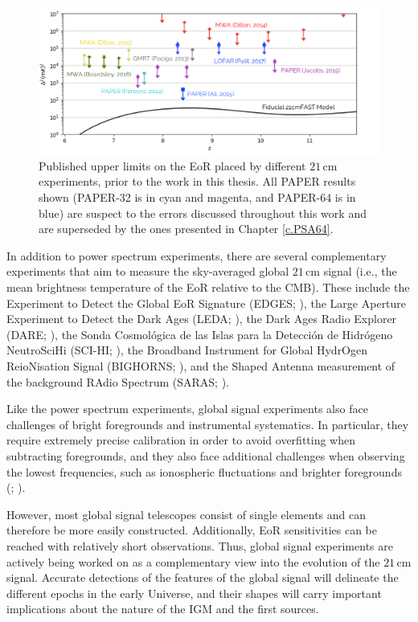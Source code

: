 \begin{figure}
    \centering
    \includegraphics[width=1\textwidth]{plots/statusfield.png}
    \caption{Published upper limits on the EoR placed by different $21$\,cm experiments, prior to the work in this thesis. All PAPER results shown (PAPER-32 is in cyan and magenta, and PAPER-64 is in blue) are suspect to the errors discussed throughout this work and are superseded by the ones presented in Chapter \ref{c.PSA64}.}
    \label{fig:statusfield}
\end{figure}

In addition to power spectrum experiments, there are several complementary experiments that aim to measure the sky-averaged global $21$\,cm signal (i.e., the mean brightness temperature of the EoR relative to the CMB). These include the Experiment to Detect the Global EoR Signature (EDGES; \citealt{bowman2010}), the Large Aperture Experiment to Detect the Dark Ages (LEDA; \citealt{bernardi_et_al2016}), the Dark Ages Radio Explorer (DARE; \citealt{burns2012}), the Sonda Cosmol\'ogica de las Islas para la Detecci\'on de Hidr\'ogeno NeutroSciHi (SCI-HI; \citealt{voytek2014}), the Broadband Instrument for Global HydrOgen ReioNisation Signal (BIGHORNS; \citealt{sokolowski2015}), and the Shaped Antenna measurement of the background RAdio Spectrum (SARAS; \citealt{patra2015}).

Like the power spectrum experiments, global signal experiments also face challenges of bright foregrounds and instrumental systematics. In particular, they require extremely precise calibration in order to avoid overfitting when subtracting foregrounds, and they also face additional challenges when observing the lowest frequencies, such as ionospheric fluctuations and brighter foregrounds (\citealt{vedantham_et_al2014}; \citealt{datta_et_al2014}).

However, most global signal telescopes consist of single elements and can therefore be more easily constructed. Additionally, EoR sensitivities can be reached with relatively short observations. Thus, global signal experiments are actively being worked on as a complementary view into the evolution of the $21$\,cm signal. Accurate detections of the features of the global signal will delineate the different epochs in the early Universe, and their shapes will carry important implications about the nature of the IGM and the first sources.

